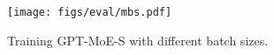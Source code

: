 \begin{figure}[htbp]
    \centering
    \texttt{[image: figs/eval/mbs.pdf]}
    \captionsetup{justification=raggedright}
    \caption{Training GPT-MoE-S with different batch sizes.}
    \captionsetup{justification=centering}
    \label{fig:rematerialization}
\end{figure}
